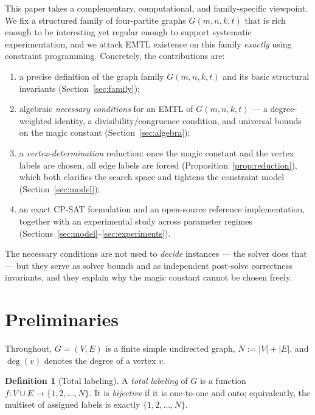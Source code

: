 \documentclass[11pt,a4paper]{article}
\theoremstyle{plain}
\theoremstyle{definition}
\newtheorem{definition}{Definition}
\theoremstyle{remark}
\newcommand{\Gfam}{G(m,n,k,t)}
\DeclareMathOperator{\degr}{deg}
\begin{document}
This paper takes a complementary, computational, and family-specific viewpoint.
We fix a structured family of four-partite graphs $\Gfam$ that is rich enough to be
interesting yet regular enough to support systematic experimentation, and we attack
EMTL existence on this family \emph{exactly} using constraint programming. Concretely,
the contributions are:

\begin{enumerate}[label=(\roman*),itemsep=1pt]
  \item a precise definition of the graph family $\Gfam$ and its basic structural
        invariants (Section~\ref{sec:family});
  \item algebraic \emph{necessary conditions} for an EMTL of $\Gfam$ --- a
        degree-weighted identity, a divisibility/congruence condition, and universal
        bounds on the magic constant (Section~\ref{sec:algebra});
  \item a \emph{vertex-determination} reduction: once the magic constant and the
        vertex labels are chosen, all edge labels are forced
        (Proposition~\ref{prop:reduction}), which both clarifies the search space and
        tightens the constraint model (Section~\ref{sec:model});
  \item an exact CP-SAT formulation and an open-source reference implementation,
        together with an experimental study across parameter regimes
        (Sections~\ref{sec:model}--\ref{sec:experiments}).
\end{enumerate}

The necessary conditions are not used to \emph{decide} instances --- the solver does
that --- but they serve as solver bounds and as independent post-solve correctness
invariants, and they explain why the magic constant cannot be chosen freely.

\section{Preliminaries}\label{sec:prelim}

Throughout, $G=(V,E)$ is a finite simple undirected graph, $N:=|V|+|E|$, and
$\degr(v)$ denotes the degree of a vertex $v$.

\begin{definition}[Total labeling]
A \emph{total labeling} of $G$ is a function $f\colon V\cup E\to\{1,2,\dots,N\}$.
It is \emph{bijective} if it is one-to-one and onto; equivalently, the multiset of
assigned labels is exactly $\{1,2,\dots,N\}$.
\end{definition}
\end{document}
